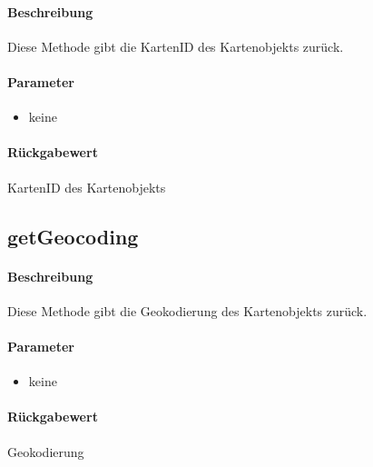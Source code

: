 \paragraph*{Beschreibung}
Diese Methode gibt die KartenID des Kartenobjekts zurück.
\paragraph*{Parameter}
\begin{itemize}
    \item keine
\end{itemize}
\paragraph*{Rückgabewert}
KartenID des Kartenobjekts

\subsection{getGeocoding}
\paragraph*{Beschreibung}
Diese Methode gibt die Geokodierung des Kartenobjekts zurück.
\paragraph*{Parameter}
\begin{itemize}
    \item keine
\end{itemize}
\paragraph*{Rückgabewert}
Geokodierung